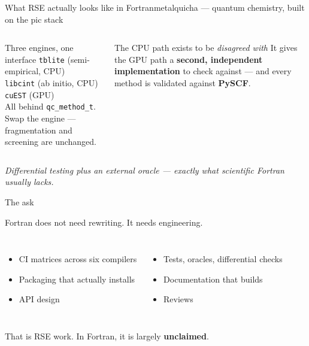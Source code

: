 \documentclass[aspectratio=169]{beamer}
\begin{document}
\begin{frame}{What RSE actually looks like in Fortran}{metalquicha --- quantum chemistry, built on the pic stack}
  \begin{columns}[T,onlytextwidth]
      \begin{block}{Three engines, one interface}
        {\footnotesize
        \texttt{tblite} (semi-empirical, CPU) \\
        \texttt{libcint} (ab initio, CPU) \\
        \texttt{cuEST} (GPU) \\[.35em]
        All behind \texttt{qc\_method\_t}. Swap the engine --- fragmentation and screening
        are unchanged.}
      \end{block}
      \begin{exampleblock}{The CPU path exists to be \emph{disagreed with}}
        {\footnotesize It gives the GPU path a \textbf{second, independent implementation}
        to check against --- and every method is validated against \textbf{PySCF}.}
      \end{exampleblock}
  \end{columns}
  \vspace{.5em}
  \centering
       

  \vspace{.5em}
  {\footnotesize\itshape Differential testing plus an external oracle --- exactly what scientific Fortran usually lacks.}
\end{frame}

\begin{frame}{The ask}
  \begin{cookiequote}
    Fortran does not need rewriting. It needs engineering.
  \end{cookiequote}
  \vspace{.5em}
  \begin{columns}[T,onlytextwidth]
      \begin{itemize}
        \item CI matrices across six compilers
        \item Packaging that actually installs
        \item API design
      \end{itemize}
      \begin{itemize}
        \item Tests, oracles, differential checks
        \item Documentation that builds
        \item Reviews
      \end{itemize}
  \end{columns}
  \vfill
  \begin{exampleblock}{}
    \centering That is RSE work. In Fortran, it is largely \textbf{unclaimed}.
  \end{exampleblock}
\end{frame}
\end{document}
